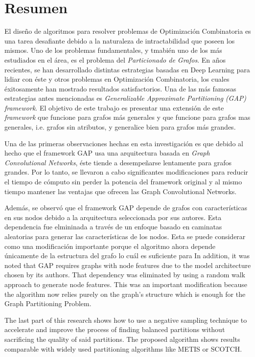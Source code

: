 

\chapter*{Resumen}

El diseño de algoritmos para resolver problemas de Optimización Combinatoria es una tarea desafiante debido a la naturaleza de intractabilidad que poseen los mismos. Uno de los problemas fundamentales, y tmabién uno de los más estudiados en el área, es el problema del \textit{Particionado de Grafos}. En años recientes, se han desarrollado distintas estrategias basadas en Deep Learning para lidiar con éste y otros problemas en Optimización Combinatoria, los cuales éxitosamente han mostrado resultados satisfactorios. Una de las más famosas estrategias antes mencionadas es \textit{Generalizable Approximate Partitioning (GAP) framework}. El objetivo de este trabajo es presentar una extensión de este \textit{framework} que funcione para grafos más generales y que funcione para grafos mas generales, i.e. grafos sin atributos, y generalice bien para grafos más grandes.  

Una de las primeras observaciones hechas en esta investigación es que debido al hecho que el framework GAP usa una arquitectura basada en \textit{Graph Convolutional Networks}, éste tiende a desempeñarse lentamente para grafos grandes. Por lo tanto, se llevaron a cabo significantes modificaciones para reducir el tiempo de cómputo sin perder la potencia del framework original y al mismo tiempo mantener las ventajas que ofrecen las Graph Convolutional Networks.

Además, se observó que el framework GAP depende de grafos con características en sus nodos debido a la arquitectura seleccionada por sus autores. Esta dependencia fue elmininada a través de un enfoque basado en caminatas aleatorias para generar las características de los nodos. Esta se puede considerar como una modificación importante porque el algoritmo ahora depende únicamente de la estructura del grafo lo cuál es suficiente para 
In addition, it was noted that GAP requires graphs with node features due to the model architecture chosen by its authors. That dependency was eliminated by using a random walk approach to generate node features. This was an important modification because the algorithm now relies purely on the graph's structure which is enough for the Graph Partitioning Problem.

The last part of this research shows how to use a negative sampling technique to accelerate and improve the process of finding balanced partitions without sacrificing the quality of said partitions. The proposed algorithm shows results comparable with widely used partitioning algorithms like METIS or SCOTCH.

